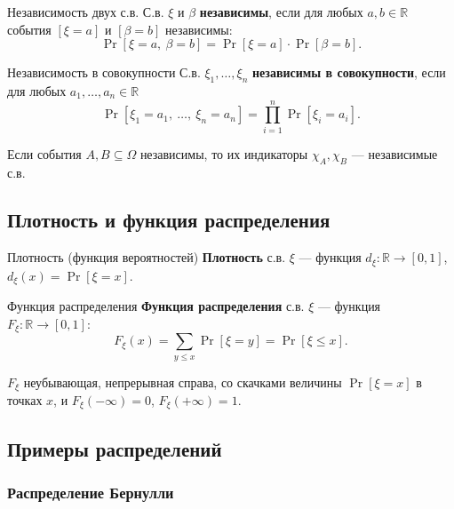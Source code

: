 \begin{Definition}{Независимость двух с.в.}{}
	С.в. $\xi$ и $\beta$ \textbf{независимы}, если для любых $a,b\in\mathbb{R}$ события $[\xi=a]$ и $[\beta=b]$ независимы:
	\[
	\Pr[\xi=a,\ \beta=b]=\Pr[\xi=a]\cdot\Pr[\beta=b].
	\]
\end{Definition}

\begin{Definition}{Независимость в совокупности}{}
	С.в. $\xi_1,\dots,\xi_n$ \textbf{независимы в совокупности}, если для любых $a_1,\dots,a_n\in\mathbb{R}$
	\[
	\Pr[\xi_1=a_1,\ \dots,\ \xi_n=a_n]=\prod_{i=1}^n\Pr[\xi_i=a_i].
	\]
\end{Definition}

\begin{Statement}{}{}
	Если события $A,B\subseteq\Omega$ независимы, то их индикаторы $\chi_A,\chi_B$ — независимые с.в.
\end{Statement}

\subsection{Плотность и функция распределения}

\begin{Definition}{Плотность (функция вероятностей)}{}
	\textbf{Плотность} с.в. $\xi$ — функция $d_\xi\colon\mathbb{R}\to[0,1]$, $d_\xi(x)=\Pr[\xi=x]$.
\end{Definition}

\begin{Definition}{Функция распределения}{}
	\textbf{Функция распределения} с.в. $\xi$ — функция $F_\xi\colon\mathbb{R}\to[0,1]$:
	\[
	F_\xi(x)=\sum_{y\le x}\Pr[\xi=y]=\Pr[\xi\le x].
	\]
\end{Definition}

\begin{Remark}{}{}
	$F_\xi$ неубывающая, непрерывная справа, со скачками величины $\Pr[\xi=x]$ в точках $x$, и $F_\xi(-\infty)=0$, $F_\xi(+\infty)=1$.
\end{Remark}

\subsection{Примеры распределений}

\subsubsection*{Распределение Бернулли}

